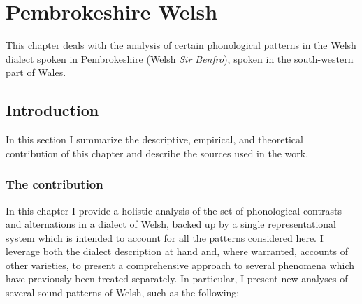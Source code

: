 \chapter{Pembrokeshire Welsh}
\label{cha:pembrokeshire-welsh}

This chapter deals with the analysis of certain phonological patterns in the Welsh dialect spoken in Pembrokeshire (Welsh \emph{Sir Benfro}), spoken in the south\hyp western part of Wales.

\section{Introduction}
\label{sec:introduction}

In this section I summarize the descriptive, empirical, and theoretical contribution of this chapter and describe the sources used in the work.

\subsection{The contribution}
\label{sec:contribution}

In this chapter I provide a holistic analysis of the set of phonological contrasts and alternations in a dialect of Welsh, backed up by a single representational system which is intended to account for all the patterns considered here. I leverage both the dialect description at hand and, where warranted, accounts of other varieties, to present a comprehensive approach to several phenomena which have previously been treated separately. In particular, I present new analyses of several sound patterns of Welsh, such as the following:

